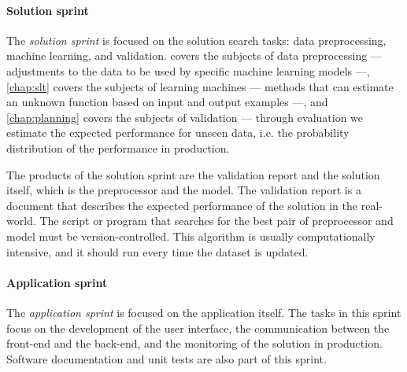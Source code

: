 \paragraph{Solution sprint}
The \emph{solution sprint} is focused on the solution search tasks: data preprocessing, machine
learning, and validation.   covers the subjects of data
preprocessing ---
adjustments to the data to be used by specific machine learning models ---, \cref{chap:slt}
covers the subjects of learning machines --- methods that can estimate an unknown function
based on input and output examples  ---, and \cref{chap:planning} covers
the subjects of validation --- through evaluation we estimate the expected performance for unseen
data, i.e. the probability distribution of the performance in production.

The products of the solution sprint are the validation report and the solution itself,
which is the preprocessor and the model.  The validation report is a document that
describes the expected performance of the solution in the real-world.  The script or
program that searches for the best pair of preprocessor and model must be
version-controlled.  This algorithm is usually computationally intensive, and it should
run every time the dataset is updated.

\paragraph{Application sprint}
The \emph{application sprint} is focused on the application itself.  The tasks in this
sprint focus on the development of the user interface, the communication between the
front-end and the back-end, and the monitoring of the solution in production.  Software
documentation and unit tests are also part of this sprint.

